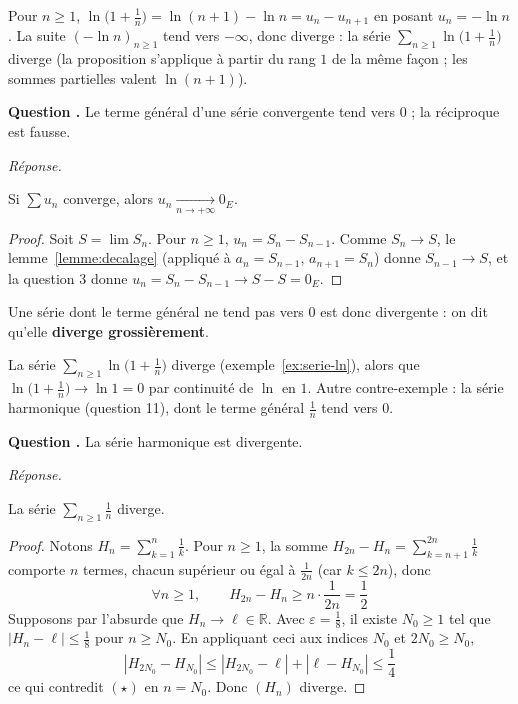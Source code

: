 \documentclass[11pt]{article}
\newcounter{qnum}
\newcommand{\question}[1]{%
\stepcounter{qnum}%
\bigskip
\noindent\textbf{Question \theqnum.} #1\par}
\newcommand{\reponse}{\noindent\textit{Réponse.}\ }
\begin{document}
\begin{exemple}
\label{ex:serie-ln}
Pour $n\geq 1$, $\ln\big(1+\frac1n\big)=\ln(n+1)-\ln n=u_n-u_{n+1}$ en posant $u_n=-\ln n$. La suite $(-\ln n)_{n\geq1}$ tend vers $-\infty$, donc diverge : la série $\sum_{n\geq1}\ln\big(1+\frac1n\big)$ diverge (la proposition s'applique à partir du rang $1$ de la même façon ; les sommes partielles valent $\ln(n+1)$).
\end{exemple}

\question{Le terme général d'une série convergente tend vers $0$ ; la réciproque est fausse.}
\reponse

\begin{theo}
\label{theo:terme-general-nul}
Si $\sum u_n$ converge, alors $u_n\xrightarrow[n\to+\infty]{}0_E$.
\end{theo}

\begin{proof}
Soit $S=\lim S_n$. Pour $n\geq 1$, $u_n=S_n-S_{n-1}$. Comme $S_n\to S$, le lemme~\ref{lemme:decalage} (appliqué à $a_n=S_{n-1}$, $a_{n+1}=S_n$) donne $S_{n-1}\to S$, et la question 3 donne $u_n=S_n-S_{n-1}\to S-S=0_E$.
\end{proof}

Une série dont le terme général ne tend pas vers $0$ est donc divergente : on dit qu'elle \textbf{diverge grossièrement}.

\begin{remarque}
La série $\sum_{n\geq1}\ln\big(1+\frac1n\big)$ diverge (exemple~\ref{ex:serie-ln}), alors que $\ln\big(1+\frac1n\big)\to\ln 1=0$ par continuité de $\ln$ en $1$. Autre contre-exemple : la série harmonique (question 11), dont le terme général $\frac1n$ tend vers $0$.
\end{remarque}

\question{La série harmonique est divergente.}
\reponse

\begin{prop}
\label{prop:harmonique}
La série $\sum_{n\geq1}\frac1n$ diverge.
\end{prop}

\begin{proof}
Notons $H_n=\sum_{k=1}^n\frac1k$. Pour $n\geq 1$, la somme $H_{2n}-H_n=\sum_{k=n+1}^{2n}\frac1k$ comporte $n$ termes, chacun supérieur ou égal à $\frac{1}{2n}$ (car $k\leq 2n$), donc
\[\forall n\geq 1,\qquad H_{2n}-H_n\geq n\cdot\frac{1}{2n}=\frac12\tag{$\star$}\]
Supposons par l'absurde que $H_n\to\ell\in\mathbb{R}$. Avec $\varepsilon=\frac18$, il existe $N_0\geq 1$ tel que $|H_n-\ell|\leq\frac18$ pour $n\geq N_0$. En appliquant ceci aux indices $N_0$ et $2N_0\geq N_0$,
\[|H_{2N_0}-H_{N_0}|\leq|H_{2N_0}-\ell|+|\ell-H_{N_0}|\leq\frac14\]
ce qui contredit $(\star)$ en $n=N_0$. Donc $(H_n)$ diverge.
\end{proof}
\end{document}
